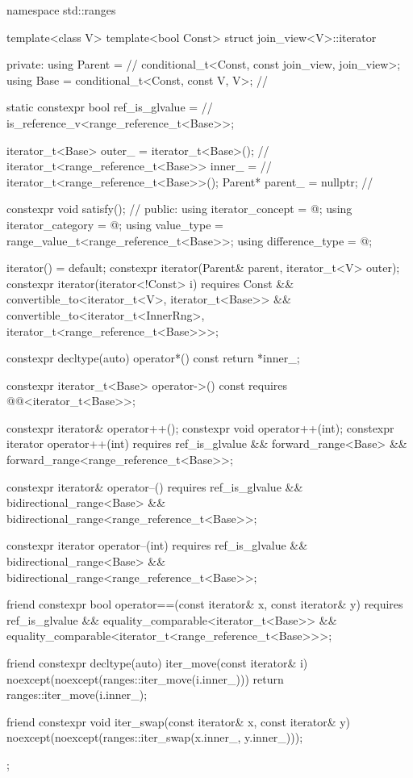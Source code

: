 \pnum
{}%
\begin{codeblock}
namespace std::ranges {
template<class V>
  template<bool Const>
  struct join_view<V>::iterator {
  private:
    using Parent =                                              // \expos
      conditional_t<Const, const join_view, join_view>;
    using Base   = conditional_t<Const, const V, V>;            // \expos

    static constexpr bool ref_is_glvalue =                      // \expos
      is_reference_v<range_reference_t<Base>>;

    iterator_t<Base> outer_ = iterator_t<Base>();               // \expos
    iterator_t<range_reference_t<Base>> inner_ =                // \expos
      iterator_t<range_reference_t<Base>>();
    Parent* parent_ = nullptr;                                  // \expos

    constexpr void satisfy();                                   // \expos
  public:
    using iterator_concept  = @\seebelow@;
    using iterator_category = @\seebelow@;
    using value_type        = range_value_t<range_reference_t<Base>>;
    using difference_type   = @\seebelow@;

    iterator() = default;
    constexpr iterator(Parent& parent, iterator_t<V> outer);
    constexpr iterator(iterator<!Const> i)
      requires Const &&
               convertible_to<iterator_t<V>, iterator_t<Base>> &&
               convertible_to<iterator_t<InnerRng>,
                              iterator_t<range_reference_t<Base>>>;

    constexpr decltype(auto) operator*() const { return *inner_; }

    constexpr iterator_t<Base> operator->() const
      requires @@<iterator_t<Base>>;

    constexpr iterator& operator++();
    constexpr void operator++(int);
    constexpr iterator operator++(int)
      requires ref_is_glvalue && forward_range<Base> &&
               forward_range<range_reference_t<Base>>;

    constexpr iterator& operator--()
      requires ref_is_glvalue && bidirectional_range<Base> &&
               bidirectional_range<range_reference_t<Base>>;

    constexpr iterator operator--(int)
      requires ref_is_glvalue && bidirectional_range<Base> &&
               bidirectional_range<range_reference_t<Base>>;

    friend constexpr bool operator==(const iterator& x, const iterator& y)
      requires ref_is_glvalue && equality_comparable<iterator_t<Base>> &&
               equality_comparable<iterator_t<range_reference_t<Base>>>;

    friend constexpr decltype(auto) iter_move(const iterator& i)
    noexcept(noexcept(ranges::iter_move(i.inner_))) {
      return ranges::iter_move(i.inner_);
    }

    friend constexpr void iter_swap(const iterator& x, const iterator& y)
      noexcept(noexcept(ranges::iter_swap(x.inner_, y.inner_)));
  };
}
\end{codeblock}

